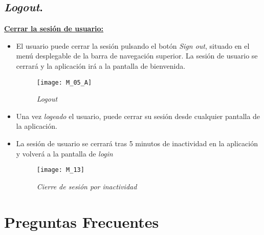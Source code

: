 \subsection{\emph{Logout}.}


\textbf{\underline{Cerrar la sesión de usuario:} }

\begin{itemize}

\item El usuario puede cerrar la sesión pulsando el botón \emph{Sign out}, situado en el menú desplegable de la barra de navegación superior. La sesión de usuario se cerrará y la aplicación irá a la pantalla de bienvenida.

\begin{figure}[H]
	\centering
	\texttt{[image: M\_05\_A]}
	\caption{\emph{Logout}}
	\label{fig:M_05_A}
\end{figure}

\item Una vez \emph{logeado} el usuario, puede cerrar su sesión desde cualquier pantalla de la aplicación.

\item La sesión de usuario se cerrará tras 5 minutos de inactividad en la aplicación y volverá a la pantalla de \emph{login}
\begin{figure}[H]
	\centering
	\texttt{[image: M\_13]}
	\caption{\emph{Cierre de sesión por inactividad}}
	\label{fig:M_13}
\end{figure}

\end{itemize}
\newpage
\section{Preguntas Frecuentes}

